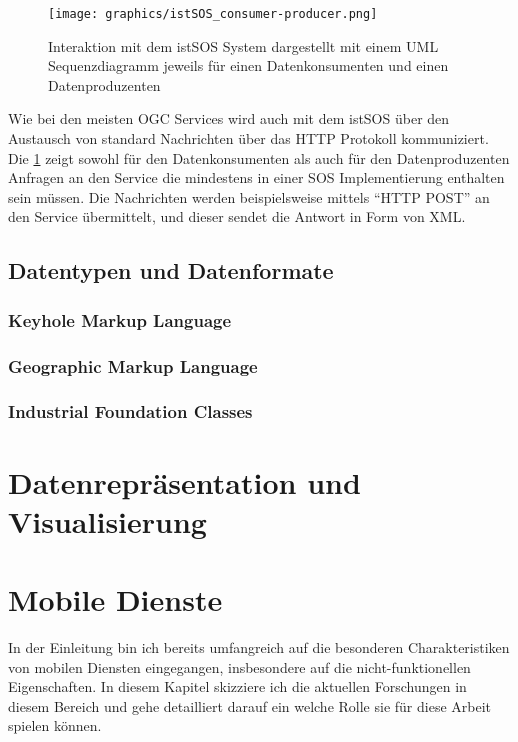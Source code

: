 \begin{figure}[H]
	\centering
 	 \texttt{[image: graphics/istSOS\_consumer-producer.png]} 
	\caption{Interaktion mit dem istSOS System dargestellt mit einem UML Sequenzdiagramm jeweils für einen Datenkonsumenten und einen Datenproduzenten \citep{cannata_welcome_2014}}
	 \label{fig:istsos_consumer-producer}
\end{figure}

Wie bei den meisten \gls{OGC} Services wird auch mit dem \gls{istSOS} über den Austausch von standard Nachrichten über das \gls{HTTP} Protokoll kommuniziert. Die  \ref{fig:istsos_consumer-producer} zeigt sowohl für den Datenkonsumenten als auch für den Datenproduzenten Anfragen an den Service die mindestens in einer \gls{SOS} Implementierung enthalten sein müssen. Die Nachrichten werden beispielsweise mittels ``HTTP POST'' an den Service übermittelt, und dieser sendet die Antwort in Form von \gls{XML}. 


\subsection{Datentypen und Datenformate}
\subsubsection{Keyhole Markup Language}
\subsubsection{Geographic Markup Language}
\subsubsection{Industrial Foundation Classes}

\section{Datenrepräsentation und Visualisierung}


\section{Mobile Dienste}
In der Einleitung bin ich bereits umfangreich auf die besonderen Charakteristiken von mobilen Diensten eingegangen, insbesondere auf die nicht-funktionellen Eigenschaften. In diesem Kapitel skizziere ich die aktuellen Forschungen in diesem Bereich und gehe detailliert darauf ein welche Rolle sie für diese Arbeit spielen können.

